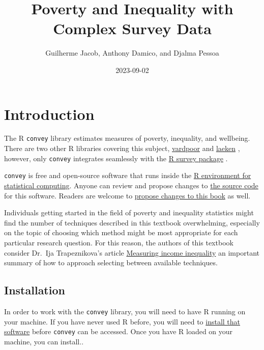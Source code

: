 \documentclass[
]{book}
\title{Poverty and Inequality with Complex Survey Data}
\author{Guilherme Jacob, Anthony Damico, and Djalma Pessoa}
\date{2023-09-02}
\begin{document}
\maketitle

{
\setcounter{tocdepth}{1}
\tableofcontents
}
\hypertarget{introduction}{%
\chapter{Introduction}\label{introduction}}

The R \texttt{convey} library estimates measures of poverty, inequality, and wellbeing. There are two other R libraries covering this subject, \href{https://CRAN.R-project.org/package=vardpoor}{vardpoor} \autocite{R-vardpoor} and \href{https://CRAN.R-project.org/package=laeken}{laeken} \autocite{R-laeken}, however, only \texttt{convey} integrates seamlessly with the \href{https://CRAN.R-project.org/package=survey}{R survey package} \autocite{R-survey-article,R-survey-book,R-survey}.

\texttt{convey} is free and open-source software that runs inside the \href{https://www.r-project.org/}{R environment for statistical computing}. Anyone can review and propose changes to \href{https://github.com/ajdamico/convey}{the source code} for this software. Readers are welcome to \href{https://github.com/guilhermejacob/context/}{propose changes to this book} as well.

Individuals getting started in the field of poverty and inequality statistics might find the number of techniques described in this textbook overwhelming, especially on the topic of choosing which method might be most appropriate for each particular research question. For this reason, the authors of this textbook consider Dr.~Ija Trapeznikova's article \href{https://wol.iza.org/articles/measuring-income-inequality/long}{Measuring income inequality} an important summary of how to approach selecting between available techniques.

\hypertarget{install}{%
\section{Installation}\label{install}}

In order to work with the \texttt{convey} library, you will need to have R running on your machine. If you have never used R before, you will need to \href{https://www.r-project.org/}{install that software} before \texttt{convey} can be accessed. Once you have R loaded on your machine, you can install..
\end{document}
